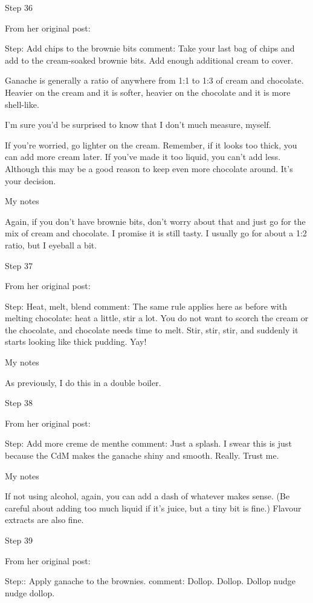 Step 36

From her original post:

Step: Add chips to the brownie bits
comment: Take your last bag of chips and add to the cream-soaked brownie bits. Add enough additional cream to cover.

Ganache is generally a ratio of anywhere from 1:1 to 1:3 of cream and chocolate. Heavier on the cream and it is softer, heavier on the chocolate and it is more shell-like.

I'm sure you'd be surprised to know that I don't much measure, myself.

If you're worried, go lighter on the cream. Remember, if it looks too thick, you can add more cream later. If you've made it too liquid, you can't add less. Although this may be a good reason to keep even more chocolate around. It's your decision.

My notes

Again, if you don't have brownie bits, don't worry about that and just go for the mix of cream and chocolate. I promise it is still tasty. I usually go for about a 1:2 ratio, but I eyeball a bit.

Step 37

From her original post:

Step: Heat, melt, blend
comment: The same rule applies here as before with melting chocolate: heat a little, stir a lot. You do not want to scorch the cream or the chocolate, and chocolate needs time to melt. Stir, stir, stir, and suddenly it starts looking like thick pudding. Yay!

My notes

As previously, I do this in a double boiler.

Step 38

From her original post:

Step: Add more creme de menthe
comment: Just a splash. I swear this is just because the CdM makes the ganache shiny and smooth. Really. Trust me.

My notes

If not using alcohol, again, you can add a dash of whatever makes sense. (Be careful about adding too much liquid if it's juice, but a tiny bit is fine.) Flavour extracts are also fine.

Step 39

From her original post:

Step:: Apply ganache to the brownies.
comment: Dollop. Dollop. Dollop nudge nudge dollop.

